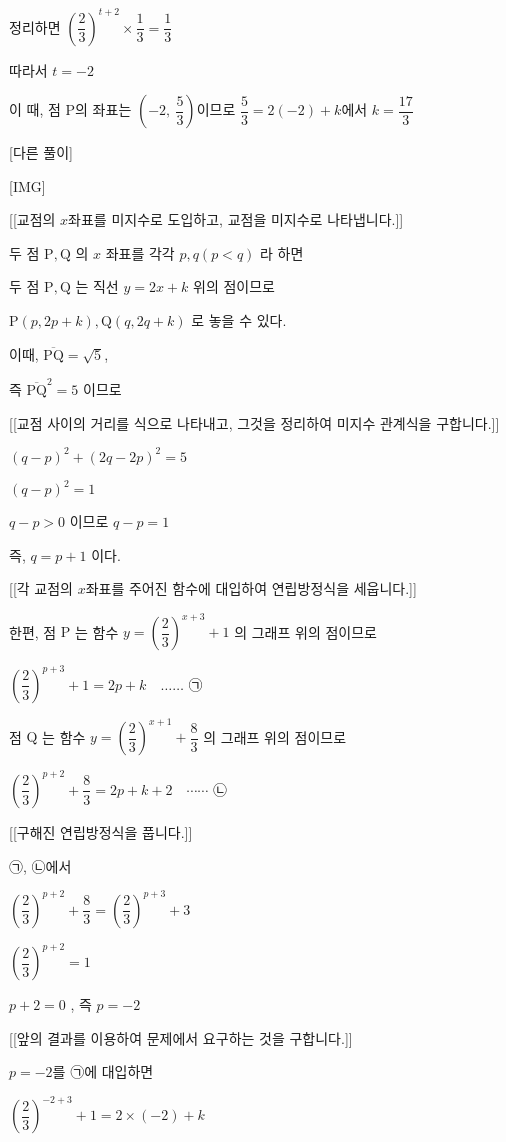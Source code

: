 \documentclass{oblivoir}
\begin{document}
정리하면 $\left(\dfrac{2}{3}\right)^{t+2}\times\dfrac{1}{3}=\dfrac{1}{3}$

따라서 $t=-2$

이 때, 점 $\mathrm{P}$의 좌표는 $\left(-2,\:\dfrac{5}{3}\right)$이므로 $\dfrac{5}{3}= 2(-2)+k$에서 $k=\dfrac{17}{3}$

[다른 풀이]

[IMG]

[[교점의 $x$좌표를 미지수로 도입하고, 교점을 미지수로 나타냅니다.]]

두 점 $\mathrm{P}, \mathrm{Q}$ 의 $x$ 좌표를 각각 $p, q(p< q)$ 라 하면

두 점 $\mathrm{P}, \mathrm{Q}$ 는 직선 $y=2 x+k$ 위의 점이므로

$\mathrm{P}(p, 2 p+k), \mathrm{Q}(q, 2 q+k)$ 로 놓을 수 있다.

이때, $\overline{\mathrm{PQ}}=\sqrt{5}$,

즉 $\overline{\mathrm{PQ}}^{2}=5$ 이므로

[[교점 사이의 거리를 식으로 나타내고, 그것을 정리하여 미지수 관계식을 구합니다.]]

$(q-p)^{2}+(2 q-2 p)^{2}=5$

$(q-p)^{2}=1$

$q-p>0$ 이므로 $q-p=1$

즉, $q=p+1$ 이다.

[[각 교점의 $x$좌표를 주어진 함수에 대입하여 연립방정식을 세웁니다.]]

한편, 점 $\mathrm{P}$ 는 함수 $y=\left(\dfrac{2}{3}\right)^{x+3}+1$ 의 그래프 위의 점이므로

$\left(\dfrac{2}{3}\right)^{p+3}+1=2 p+k \quad \ldots \ldots$ ㉠

점 $\mathrm{Q}$ 는 함수 $y=\left(\dfrac{2}{3}\right)^{x+1}+\dfrac{8}{3}$ 의 그래프
위의 점이므로

$\left(\dfrac{2}{3}\right)^{p+2}+\dfrac{8}{3}=2 p+k+2 \quad \cdots \cdots$ ㉡

[[구해진 연립방정식을 풉니다.]]

㉠, ㉡에서

$\left(\dfrac{2}{3}\right)^{p+2}+\dfrac{8}{3}=\left(\dfrac{2}{3}\right)^{p+3}+3$

$\left(\dfrac{2}{3}\right)^{p+2}=1$

$p+2=0$ , 즉 $p=-2$

[[앞의 결과를 이용하여 문제에서 요구하는 것을 구합니다.]]

$p=-2$를 ㉠에 대입하면

$\left(\dfrac{2}{3}\right)^{-2+3}+1=2 \times(-2)+k$
\end{document}
